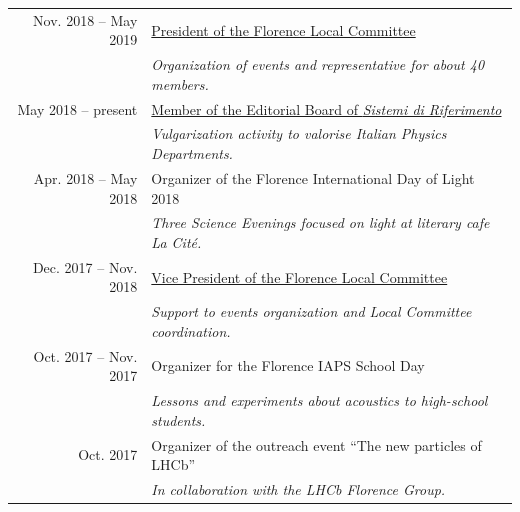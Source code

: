 \documentclass[a4, 11pt]{report}
\begin{document}
\begin{tabular*}{\textwidth}{r @{\extracolsep{\fill}} l}
            {\small Nov. 2018 -- May 2019} & \ul{President of the Florence Local Committee}\\
            & {\small \emph {Organization of events and representative for about 40 members.}}\\ [3mm]
                                            
            {\small May 2018 -- present} & \ul{Member of the Editorial Board of \emph{Sistemi di Riferimento}}\\
            & {\small \emph {Vulgarization activity to valorise Italian Physics Departments.}}\\ [3mm]
                                            
            {\small Apr. 2018 -- May 2018} & {Organizer of the Florence International Day of Light 2018}\\
            & {\small \emph {Three Science Evenings focused on light at literary cafe La Cité.}}\\ [3mm]
                                            
                                            
            {\small Dec. 2017 -- Nov. 2018} & \ul{Vice President of the Florence Local Committee}\\
            & {\small \emph {Support to events organization and Local Committee coordination.}}\\ [3mm]
                                            
            {\small Oct. 2017 -- Nov. 2017} & {Organizer for the Florence IAPS School Day}\\
            & {\small \emph {Lessons and experiments about acoustics to high-school students.}}\\ [3mm]
                                            
            {\small Oct. 2017} & {Organizer of the outreach event ``The new particles of LHCb''}\\
            & {\small \emph {In collaboration with the LHCb Florence Group.}}\\ [3mm]
                                            
        \end{tabular*}
    
\end{document}
